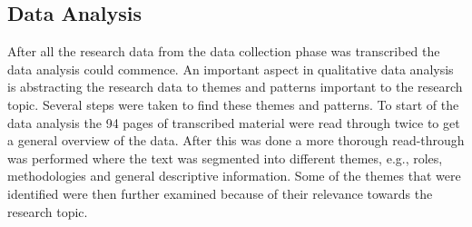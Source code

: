 \vspace{0.5cm}

\subsection{Data Analysis}

After all the research data from the data collection phase was transcribed the data analysis could commence. An important aspect in qualitative data analysis is abstracting the research data to themes and patterns important to the research topic. Several steps were taken to find these themes and patterns. To start of the data analysis the 94 pages of transcribed material were read through twice to get a general overview of the data. After this was done a more thorough read-through was performed where the text was segmented into different themes, e.g., roles, methodologies and general descriptive information. Some of the themes that were identified were then further examined because of their relevance towards the research topic.